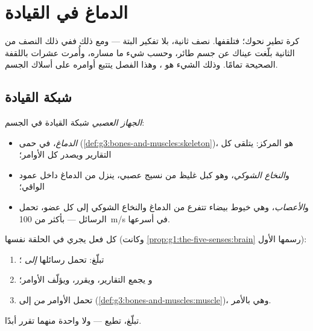 \chapter{الدماغ في القيادة}\label{ch:g5:brain-in-command}

كرة تطير نحوك؛ فتلقفها. نصف ثانية، بلا تفكير البتة --- ومع ذلك
ففي ذلك النصف من الثانية بلّغت عيناك عن جسم طائر، وحسب شيء ما
مساره، وأُمرت عشرات  باللقفة الصحيحة تمامًا. وذلك الشيء هو
، وهذا الفصل يتتبع أوامره على أسلاك الجسم.

\section{شبكة القيادة}

\begin{definition}\label{def:g5:brain-in-command:system}
\emph{الجهاز العصبي} شبكة القيادة في الجسم:
\begin{itemize}
  \item \emph{الدماغ}، في حمى 
        (\cref{def:g3:bones-and-muscles:skeleton})، هو المركز:
        يتلقى كل التقارير ويصدر كل الأوامر؛
  \item و\emph{النخاع الشوكي}، وهو كبل غليظ من
        نسيج عصبي، ينزل من الدماغ داخل عمود 
        الواقي؛
  \item و\emph{الأعصاب}، وهي خيوط بيضاء تتفرع من
        الدماغ والنخاع الشوكي إلى كل عضو، تحمل الرسائل ---
        بأكثر من \qty{100}{m/s} في أسرعها.
\end{itemize}
\end{definition}

\begin{proposition}\label{prop:g5:brain-in-command:loop}
كل فعل يجري في الحلقة نفسها
(وكانت \cref{prop:g1:the-five-senses:brain} رسمها الأول):
\begin{enumerate}
  \item \emph{} تبلّغ:  تحمل رسائلها
        \emph{إلى} ؛
  \item و\emph{} يجمع التقارير، ويقرر، ويؤلّف الأوامر؛
  \item {} تحمل الأوامر \emph{من}  إلى
        \emph{} (\cref{def:g3:bones-and-muscles:muscle})،
        وهي  بالأمر.
\end{enumerate}
 تبلّغ،  تطيع --- ولا واحدة منهما تقرر أبدًا.
\end{proposition}
\admitted


